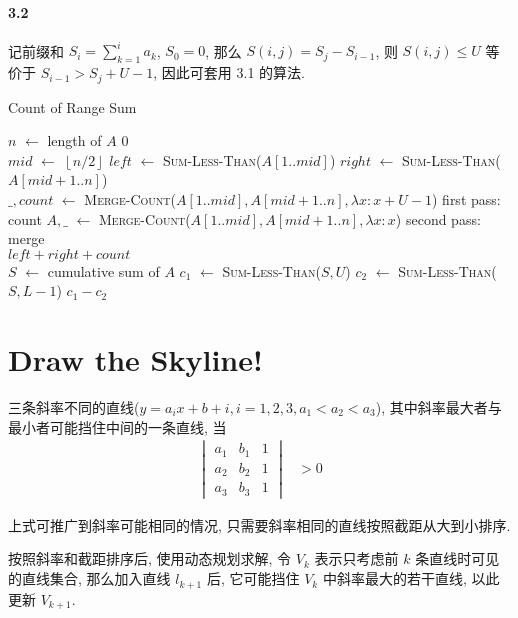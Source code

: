 \documentclass{ctexart}
\newcommand{\floor}[1]{\left\lfloor#1\right\rfloor}
\newcommand{\Let}[1]{\State #1 $\gets$}
\newcommand{\F}[2]{\textsc{#1}(#2)}
\newcommand{\Ret}[1]{\State \textbf{return} #1}
\begin{document}
\paragraph*{3.2} 记前缀和 $S_i=\sum_{k=1}^{i} a_k$, $S_0=0$, 那么 $S(i, j) = S_j - S_{i-1}$, 则 $S(i, j) \le U$ 等价于 $S_{i-1} > S_j + U -1$, 因此可套用 3.1 的算法.

\begin{algorithm}[H]
    \caption{Count of Range Sum}
    \begin{algorithmic}
        \Let{$n$} length of $A$
            \Ret $0$
        \EndIf
        \\
        \Let{$mid$} $\floor{n/2}$
        \Let{$left$} \F{Sum-Less-Than}{$A[1..mid]$}
        \Let{$right$} \F{Sum-Less-Than}{$A[mid+1..n]$}
        \\
        \Let{$\_, count$} \F{Merge-Count}{$A[1..mid], A[mid+1..n], \lambda x: x+U-1$}
        \Comment first pass: count
        \Let{$A, \_$} \F{Merge-Count}{$A[1..mid], A[mid+1..n], \lambda x: x$}
        \Comment second pass: merge
        \\
        \Ret $left+right+count$
        \EndFunction
        \\
        \Let{$S$} cumulative sum of $A$
        \Let{$c_1$} \F{Sum-Less-Than}{$S, U$}
        \Let{$c_2$} \F{Sum-Less-Than}{$S, L-1$}
        \Ret $c_1 - c_2$
        \EndFunction
    \end{algorithmic}
\end{algorithm}

\section{Draw the Skyline!}

三条斜率不同的直线($y=a_ix+b+i, i=1,2,3, a_1< a_2<a_3$), 其中斜率最大者与最小者可能挡住中间的一条直线, 当
\begin{align*}
    \begin{vmatrix}
        a_1 & b_1 & 1 \\
        a_2 & b_2 & 1 \\
        a_3 & b_3 & 1
    \end{vmatrix} & > 0
\end{align*}

上式可推广到斜率可能相同的情况, 只需要斜率相同的直线按照截距从大到小排序.

按照斜率和截距排序后, 使用动态规划求解, 令 $V_k$ 表示只考虑前 $k$ 条直线时可见的直线集合, 那么加入直线 $l_{k+1}$ 后, 它可能挡住 $V_k$ 中斜率最大的若干直线, 以此更新 $V_{k+1}$.
\end{document}
